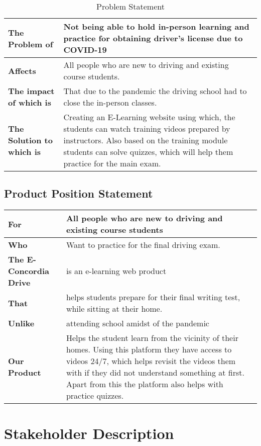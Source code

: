 \documentclass{article}
\begin{document}
\begin{table}[h!]
\begin{tabular}{|p{4.5cm}|p{11.5cm}|}
\hline
\textbf{The Problem of} & Not being able to hold in-person learning and practice for obtaining driver's license due to COVID-19 \\ \hline
\textbf{Affects} & All people who are new to driving and existing course students. \\ \hline
\textbf{The impact of which is} & That due to the pandemic the driving school had to close the in-person classes. \\ \hline
\textbf{The Solution to which is} & Creating an E-Learning website using which, the students can watch training videos prepared by instructors. Also based on the training module students can solve quizzes, which will help them practice for the main exam.\\ \hline
\end{tabular}
\caption{Problem Statement}
\label{table:1}
\end{table}

\subsection{Product Position Statement}


\begin{tabular}{|p{4.5cm}|p{11.5cm}|}
\hline
\textbf{For} & All people who are new to driving and existing course students\\ \hline
\textbf{Who}& Want to practice for the final driving exam.\\ \hline
\textbf{The E-Concordia Drive} & is an e-learning web product\\ \hline
\textbf{That} & helps students prepare for their final writing test, while sitting at their home.\\ \hline
\textbf{Unlike} & attending school amidst of the pandemic \\ \hline
\textbf{Our Product} & Helps the student learn from the vicinity of their homes. Using this platform they have access to videos 24/7, which helps revisit the videos them with if they did not understand something at first. Apart from this the platform also helps with practice quizzes.\\ \hline
\end{tabular}

\section{Stakeholder Description}
\end{document}
